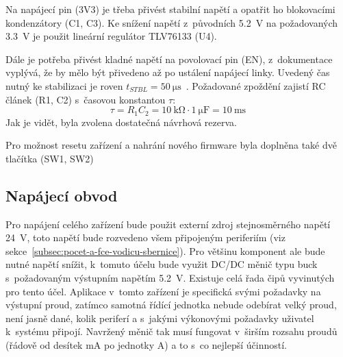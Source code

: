         Na napájecí pin (3V3) je třeba přivést stabilní napětí a opatřit ho blokovacími kondenzátory (C1, C3). Ke snížení napětí z~původních \qty{5,2}{V} na požadovaných \qty{3,3}{V} je použit lineární regulátor TLV76133 (U4). 
        
        Dále je potřeba přivést kladné napětí na povolovací pin (EN), z~dokumentace vyplývá, že by mělo být přivedeno až po ustálení napájecí linky. Uvedený čas nutný ke stabilizaci je roven \(t_{STBL}=\qty{50}{\micro\second}\)~\cite{esp32-datasheet}. Požadované zpoždění zajistí RC článek (R1, C2) s~časovou konstantou \(\tau\):
        \begin{equation}
            \tau=R_{1}C_{2}=\qty{10}{\kilo\ohm}\cdot \qty{1}{\micro\farad}=\qty{10}{\milli\second}
        \end{equation} 
        Jak je vidět, byla zvolena dostatečná návrhová rezerva. 

        Pro možnost resetu zařízení a nahrání nového firmware byla doplněna také dvě tlačítka (SW1, SW2)


    \clearpage
    \subsection{Napájecí obvod}
        \label{sec:ridici-jendotka-napajeci-obvod}
        Pro napájení celého zařízení bude použit externí zdroj stejnosměrného napětí \qty{24}{V}, toto napětí bude rozvedeno všem připojeným periferiím (viz sekce~\ref{subsec:pocet-a-fce-vodicu-sbernice}). Pro většinu komponent ale bude nutné napětí snížit, k~tomuto účelu bude využit DC/DC měnič typu buck s~požadovaným výstupním napětím \qty{5.2}{V}. Existuje celá řada čipů vyvinutých pro tento účel. Aplikace v~tomto zařízení je specifická svými požadavky na výstupní proud, zatímco samotná řídící jednotka nebude odebírat velký proud, není jasně dané, kolik periferí a s~jakými výkonovými požadavky uživatel k~systému připojí. Navržený měnič tak musí fungovat v~širším rozsahu proudů (řádově od desítek mA po jednotky A) a to s~co nejlepší účinností. 
        
